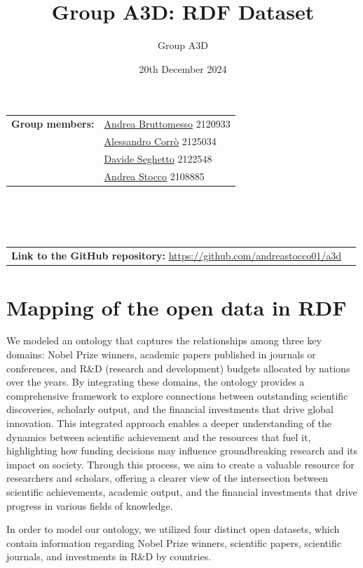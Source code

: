 \documentclass{article}
\title{Group A3D: RDF Dataset}
\author{Group A3D}
\date{20th December 2024}
\begin{document}
\maketitle

\noindent\begin{tabular}{@{}ll}
	\textbf{Group members:}
	 & \href{mailto:andrea.bruttomesso.1@studenti.unipd.it}{Andrea Bruttomesso} 2120933 \\
	 & \href{mailto:alessandro.corro.1@studenti.unipd.it}{Alessandro Corr\`o} 2125034   \\
	 & \href{mailto:davide.seghetto@studenti.unipd.it}{Davide Seghetto} 2122548         \\
	 & \href{mailto:andrea.stocco.8@studenti.unipd.it}{Andrea Stocco} 2108885           \\
\end{tabular}
\\\\\\
\noindent\begin{tabular}{@{}ll}
	\textbf{Link to the GitHub repository:} \href{https://github.com/andreastocco01/a3d}{https://github.com/andreastocco01/a3d}
\end{tabular}

\section*{Mapping of the open data in RDF}
We modeled an ontology that captures the relationships among three key domains: Nobel Prize winners, academic papers published in journals or conferences,
and R\&D (research and development) budgets allocated by nations over the years. By integrating these domains, the ontology provides a comprehensive
framework to explore connections between outstanding scientific discoveries, scholarly output, and the financial investments that drive global innovation.
This integrated approach enables a deeper understanding of the dynamics between scientific achievement and the resources that fuel it, highlighting how
funding decisions may influence groundbreaking research and its impact on society. Through this process, we aim to create a valuable resource for
researchers and scholars, offering a clearer view of the intersection between scientific achievements, academic output, and the financial investments
that drive progress in various fields of knowledge.

\noindent In order to model our ontology, we utilized four distinct open
datasets, which contain information regarding Nobel Prize winners, scientific papers, scientific journals, and investments in R\&D by countries.
\end{document}
